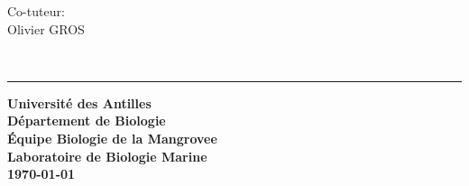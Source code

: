 \begin{titlepage}
\begin{center}
\begin{minipage}{0.3\textwidth}
\begin{flushleft}
				Co-tuteur: \\
				\hspace{0.2cm} Olivier \textsc{GROS}
			\end{flushleft}
		\end{minipage} \\[2cm]

        \rule{\linewidth}{0.5mm}
        \vfill
        
        \textbf{Université des Antilles} \\
        \textbf{Département de Biologie} \\
        \textbf{Équipe Biologie de la Mangrovee} \\
        \textbf{Laboratoire de Biologie Marine} \\
        \vspace{0.5cm}
        \textbf{\today {}}
         
    \end{center}
\end{titlepage}
